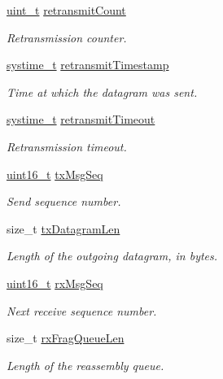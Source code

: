 \begin{DoxyCompactItemize}
\hyperlink{compiler__port_8h_a12a1e9b3ce141648783a82445d02b58d}{uint\+\_\+t} \hyperlink{struct__TlsContext_a90e51ec3496ff9ed28c315291a459330}{retransmit\+Count}
\begin{DoxyCompactList}\small\item\em Retransmission counter. \end{DoxyCompactList}\item 
\hyperlink{compiler__port_8h_ae3e32a98d431a02106616da3071832dd}{systime\+\_\+t} \hyperlink{struct__TlsContext_a4331bbb2f1761488112d356b428045d6}{retransmit\+Timestamp}
\begin{DoxyCompactList}\small\item\em Time at which the datagram was sent. \end{DoxyCompactList}\item 
\hyperlink{compiler__port_8h_ae3e32a98d431a02106616da3071832dd}{systime\+\_\+t} \hyperlink{struct__TlsContext_ad8fb0e3268744def35f37c07fa6d8150}{retransmit\+Timeout}
\begin{DoxyCompactList}\small\item\em Retransmission timeout. \end{DoxyCompactList}\item 
\hyperlink{stdint_8h_a273cf69d639a59973b6019625df33e30}{uint16\+\_\+t} \hyperlink{struct__TlsContext_ab246bb284734fbbd8f706d02a718ba55}{tx\+Msg\+Seq}
\begin{DoxyCompactList}\small\item\em Send sequence number. \end{DoxyCompactList}\item 
size\+\_\+t \hyperlink{struct__TlsContext_adf49e3b273f63ff9168dfe9573b13a0d}{tx\+Datagram\+Len}
\begin{DoxyCompactList}\small\item\em Length of the outgoing datagram, in bytes. \end{DoxyCompactList}\item 
\hyperlink{stdint_8h_a273cf69d639a59973b6019625df33e30}{uint16\+\_\+t} \hyperlink{struct__TlsContext_a649cd244f2ef72be8612927074b64b21}{rx\+Msg\+Seq}
\begin{DoxyCompactList}\small\item\em Next receive sequence number. \end{DoxyCompactList}\item 
size\+\_\+t \hyperlink{struct__TlsContext_ae018331ceefbf29baa0f4cbbeb200b32}{rx\+Frag\+Queue\+Len}
\begin{DoxyCompactList}\small\item\em Length of the reassembly queue. \end{DoxyCompactList}\item 

\end{DoxyCompactItemize}
